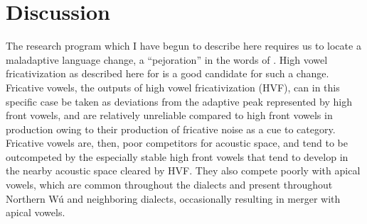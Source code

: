 \documentclass[output=paper,hidelinks]{langscibook}
\begin{document}



\section{Discussion}\label{sec:faytak:5}

The research program which I have begun to describe here requires us to locate a maladaptive language change, a ``pejoration'' in the words of \citet{vennemann}.
%
High vowel fricativization as described here for  is a good candidate for such a change.
%
Fricative vowels, the outputs of high vowel fricativization (HVF), can in this specific case be taken as deviations from the adaptive peak represented by high front vowels, and are relatively unreliable compared to high front vowels in production owing to their production of fricative noise as a cue to category. Fricative vowels are, then, poor competitors for acoustic space, and tend to be outcompeted by the especially stable high front vowels that tend to develop in the nearby acoustic space cleared by HVF. They also compete poorly with apical vowels, which are common throughout the  dialects and present throughout Northern Wú and neighboring dialects, occasionally resulting in merger with apical vowels.
\end{document}
